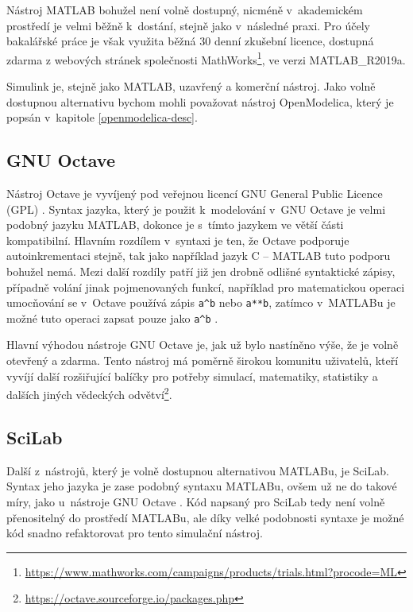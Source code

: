 Nástroj MATLAB bohužel není volně dostupný, nicméně v~akademickém prostředí je velmi běžně k~dostání, stejně jako v~následné praxi. Pro účely bakalářské práce je však využita běžná 30 denní zkušební licence, dostupná zdarma z webových stránek společnosti MathWorks\footnote{\url{https://www.mathworks.com/campaigns/products/trials.html?procode=ML}}, ve verzi MATLAB\_R2019a.

Simulink je, stejně jako MATLAB, uzavřený a komerční nástroj. Jako volně dostupnou alternativu bychom mohli považovat nástroj OpenModelica, který je popsán v~kapitole \ref{openmodelica-desc}.

\subsection{GNU Octave}
\label{octave-desc}
Nástroj Octave je vyvíjený pod veřejnou licencí GNU General Public Licence (GPL) \cite{OctaveManual}. Syntax jazyka, který je použit k~modelování v~GNU Octave je velmi podobný jazyku MATLAB, dokonce je s~tímto jazykem ve větší části kompatibilní. Hlavním rozdílem v~syntaxi je ten, že Octave podporuje autoinkrementaci stejně, tak jako například jazyk C -- MATLAB tuto podporu bohužel nemá.
Mezi další rozdíly patří již jen drobně odlišné syntaktické zápisy, případně volání jinak pojmenovaných funkcí, například pro matematickou operaci umocňování se v~Octave používá zápis \texttt{a\^\space b} nebo \texttt{a**b}, zatímco v~MATLABu je možné tuto operaci zapsat pouze jako \texttt{a\^\space b} \cite{OctaveManual}.

Hlavní výhodou nástroje GNU Octave je, jak už bylo nastíněno výše, že je volně otevřený a zdarma. Tento nástroj má poměrně širokou komunitu uživatelů, kteří vyvíjí další rozšiřující balíčky pro potřeby simulací, matematiky, statistiky a dalších jiných vědeckých odvětví\footnote{\url{https://octave.sourceforge.io/packages.php}}.


\subsection{SciLab}
\label{scilab-desc}
Další z~nástrojů, který je volně dostupnou alternativou MATLABu, je SciLab. Syntax jeho jazyka je zase podobný syntaxu MATLABu, ovšem už ne do takové míry, jako u~nástroje GNU Octave \cite{Gilberto}. Kód napsaný pro SciLab tedy není volně přenositelný do prostředí MATLABu, ale díky velké podobnosti syntaxe je možné kód snadno refaktorovat pro tento simulační nástroj.

